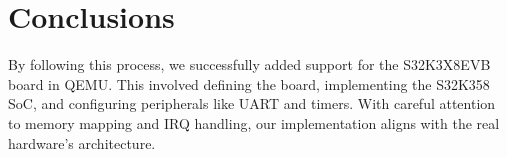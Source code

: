 \chapter{Conclusions}

By following this process, we successfully added support for the S32K3X8EVB board in QEMU. This involved defining the board, implementing the S32K358 SoC, and configuring peripherals like UART and timers. With careful attention to memory mapping and IRQ handling, our implementation aligns with the real hardware's architecture.